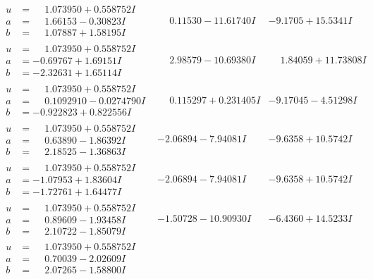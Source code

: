 \documentclass[1p]{elsarticle_modified}
\theoremstyle{definition}
\begin{document}
$$\begin{array}{c|c|c}
\begin{aligned}
u &= \phantom{-}1.073950 + 0.558752 I \\
a &= \phantom{-}1.66153 - 0.30823 I \\
b &= \phantom{-}1.07887 + 1.58195 I\end{aligned}
 & \phantom{-}0.11530 - 11.61740 I & -9.1705 + 15.5341 I \\ \hline\begin{aligned}
u &= \phantom{-}1.073950 + 0.558752 I \\
a &= -0.69767 + 1.69151 I \\
b &= -2.32631 + 1.65114 I\end{aligned}
 & \phantom{-}2.98579 - 10.69380 I & \phantom{-}1.84059 + 11.73808 I \\ \hline\begin{aligned}
u &= \phantom{-}1.073950 + 0.558752 I \\
a &= \phantom{-}0.1092910 - 0.0274790 I \\
b &= -0.922823 + 0.822556 I\end{aligned}
 & \phantom{-}0.115297 + 0.231405 I & -9.17045 - 4.51298 I \\ \hline\begin{aligned}
u &= \phantom{-}1.073950 + 0.558752 I \\
a &= \phantom{-}0.63890 - 1.86392 I \\
b &= \phantom{-}2.18525 - 1.36863 I\end{aligned}
 & -2.06894 - 7.94081 I & -9.6358 + 10.5742 I \\ \hline\begin{aligned}
u &= \phantom{-}1.073950 + 0.558752 I \\
a &= -1.07953 + 1.83604 I \\
b &= -1.72761 + 1.64477 I\end{aligned}
 & -2.06894 - 7.94081 I & -9.6358 + 10.5742 I \\ \hline\begin{aligned}
u &= \phantom{-}1.073950 + 0.558752 I \\
a &= \phantom{-}0.89609 - 1.93458 I \\
b &= \phantom{-}2.10722 - 1.85079 I\end{aligned}
 & -1.50728 - 10.90930 I & -6.4360 + 14.5233 I \\ \hline\begin{aligned}
u &= \phantom{-}1.073950 + 0.558752 I \\
a &= \phantom{-}0.70039 - 2.02609 I \\
b &= \phantom{-}2.07265 - 1.58800 I\end{aligned}

\end{array}$$
\end{document}
